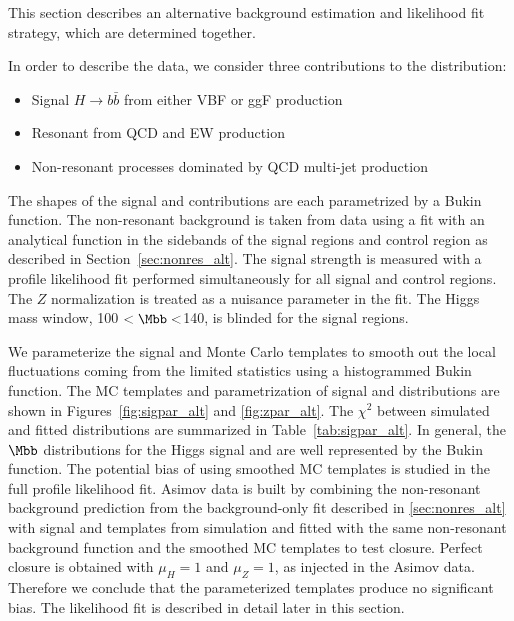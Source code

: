 This section describes an alternative background estimation and likelihood fit strategy, which are determined together.

In order to describe the data, we consider three contributions to the \Mbb{} distribution:  
\begin{itemize}
  \item Signal $H\rightarrow b \bar b$ from either VBF or ggF production
  \item Resonant \zjets{} from QCD and EW production
  \item Non-resonant processes dominated by QCD multi-jet production
\end{itemize}

The shapes of the signal and \zjets{} contributions are each parametrized by a Bukin function. The non-resonant background is taken from data using a fit with an analytical function in the \Mbb{} sidebands of the signal regions and control region as described in Section~\ref{sec:nonres_alt}.
The signal strength is measured with a profile likelihood fit performed
simultaneously for all signal and control regions.  The $Z$ normalization is treated as a nuisance parameter in the fit.  The Higgs mass window, 100 \GeV$<\Mbb<$140\GeV, is blinded for the signal regions.  

%
We parameterize the signal and \zjets{} Monte Carlo templates to smooth out the local fluctuations coming from the limited statistics using a histogrammed Bukin function. The MC templates and parametrization of signal and \zjets{} \Mbb{} distributions are shown in Figures~\ref{fig:sigpar_alt} and \ref{fig:zpar_alt}. The $\chi^2$ between simulated and fitted distributions are summarized in Table~\ref{tab:sigpar_alt}. In general, the $\Mbb$ distributions for the Higgs signal and \zjets{} are well represented by the Bukin function. The potential bias of using smoothed MC templates is studied in the full profile likelihood fit. Asimov data is built by combining the non-resonant background prediction from the background-only fit described in \ref{sec:nonres_alt} with signal and \zjets{} templates from simulation and fitted with the same non-resonant background function and the smoothed MC templates to test closure. Perfect closure is obtained with $\mu_{H}=1$ and $\mu_{Z}=1$, as injected in the Asimov data.  Therefore we conclude that the parameterized templates produce no significant bias.  The likelihood fit is described in detail later in this section.

